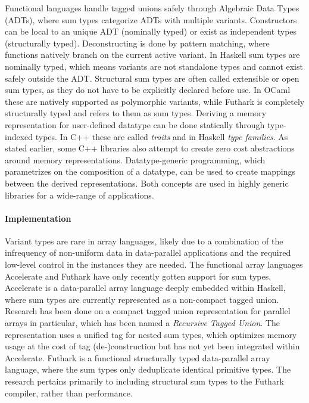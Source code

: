 \documentclass{article}
\begin{document}
Functional languages handle tagged unions safely through Algebraic Data Types (ADTs), where sum types categorize ADTs with multiple variants.
Constructors can be local to an unique ADT (nominally typed) or exist as independent types (structurally typed).
Deconstructing is done by pattern matching, where functions natively branch on the current active variant.
In Haskell sum types are nominally typed, which means variants are not standalone types and cannot exist safely outside the ADT.
Structural sum types are often called extensible or open sum types, as they do not have to be explicitly declared before use.
In OCaml these are natively supported as polymorphic variants\cite{polymorphic-variants}, while Futhark is completely structurally typed and refers to them as sum types\cite{futhark-sum-types}.
Deriving a memory representation for user-defined datatype can be done statically through type-indexed types\cite{type-indexed}\cite{associated-types}.
In C++ these are called {\it traits}\cite{c++traits} and in Haskell {\it type families}\cite{type-families}. 
As stated earlier, some C++ libraries also attempt to create zero cost abstractions around memory representations\cite{llama}\cite{alpaka}.
Datatype-generic programming\cite{datatype-generic-programming}, which parametrizes on the composition of a datatype, can be used to create mappings between the derived representations.
Both concepts are used in highly generic libraries for a wide-range of applications\cite{generic-programming}. 

\paragraph{Implementation}

Variant types are rare in array languages, likely due to a combination of the infrequency of non-uniform data in data-parallel applications and the required low-level control in the instances they are needed.
The functional array languages Accelerate and Futhark have only recently gotten support for sum types\cite{accelerate-sum-types}\cite{futhark-sum-types}.
Accelerate is a data-parallel array language deeply embedded within Haskell, where sum types are currently represented as a non-compact tagged union.
Research has been done on a compact tagged union representation for parallel arrays in particular, which has been named a {\it Recursive Tagged Union}\cite{accelerate-sum-types}.
The representation uses a unified tag for nested sum types, which optimizes memory usage at the cost of tag (de-)construction but has not yet been integrated within Accelerate. 
Futhark is a functional structurally typed data-parallel array language, where the sum types only deduplicate identical primitive types.
The research pertains primarily to including structural sum types to the Futhark compiler\cite{futhark-sum-types}, rather than performance.
\end{document}
